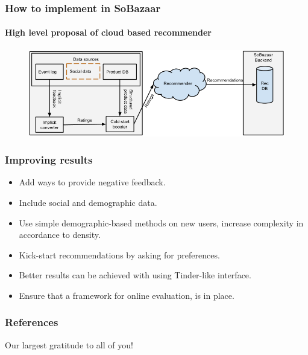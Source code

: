 \documentclass{beamer}
\begin{document}
  \begin{frame}
    \frametitle{How to implement in SoBazaar}
    \framesubtitle{High level proposal of cloud based recommender}
    \begin{figure}[H]
        \includegraphics[scale=0.4]{../src/image/theCloud}
        \centering
    \end{figure}
  \end{frame}

  \begin{frame}
    \frametitle{Improving results}
    \begin{itemize}
      \item Add ways to provide negative feedback.
      \item Include social and demographic data.
      \item Use simple demographic-based methods on new users, increase
      complexity in accordance to density.
      \item Kick-start recommendations by asking for preferences.
      \item Better results can be achieved with using Tinder-like interface.
      \item Ensure that a framework for online evaluation, is in place.
    \end{itemize}
  \end{frame}

  \begin{frame}[allowframebreaks]
    \frametitle{References}
    
    
  \end{frame}

  \begin{frame}
    \huge Our largest gratitude to all of you!
  \end{frame}
\end{document}
